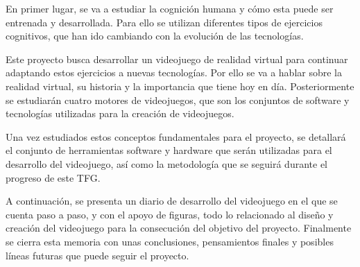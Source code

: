 En primer lugar, se va a estudiar la cognición humana y cómo esta puede ser entrenada y desarrollada. Para ello se utilizan diferentes tipos de ejercicios cognitivos, que han ido cambiando con la evolución de las tecnologías. 

Este proyecto busca desarrollar un videojuego de realidad virtual para continuar adaptando estos ejercicios a nuevas tecnologías. Por ello se va a hablar sobre la realidad virtual, su historia y la importancia que tiene hoy en día. Posteriormente se estudiarán cuatro motores de videojuegos, que son los conjuntos de software y tecnologías utilizadas para la creación de videojuegos.

Una vez estudiados estos conceptos fundamentales para el proyecto, se detallará el conjunto de herramientas software y hardware que serán utilizadas para el desarrollo del videojuego, así como la metodología que se seguirá durante el progreso de este TFG.

A continuación, se presenta un diario de desarrollo del videojuego en el que se cuenta paso a paso, y con el apoyo de figuras, todo lo relacionado al diseño y creación del videojuego para la consecución del objetivo del proyecto. Finalmente se cierra esta memoria con unas conclusiones, pensamientos finales y posibles líneas futuras que puede seguir el proyecto.





\chapterend

